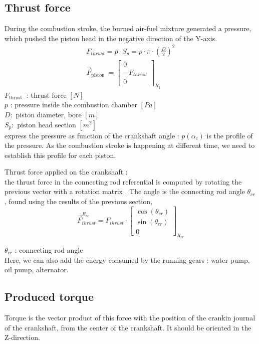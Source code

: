 \documentclass[12pt,a4paper]{article}
\begin{document}
	\subsection{Thrust force}
	During the combustion stroke, the burned air-fuel mixture generated a pressure, which pushed the piston head in the negative direction of the Y-axis.
	\begin{gather*}
		F_{thrust}=p \cdot S_{p}=p \cdot \pi \cdot\left(\frac{D}{2}\right)^{2}  \tag{2}\\
		\vec{F}_{\text {piston }}=\left[\begin{array}{c}
			0 \\
			- F_{thrust} \\
			0
		\end{array}\right]_{R_{1}} \tag{3}
	\end{gather*}
	$F_{\text {thrust }}$ : thrust force $[N]$\\
	$p$ : pressure inside the combustion chamber $[P a]$\\
	$D:$ piston diameter, bore $[m]$\\
	$S_{p}:$ piston head section $\left[m^{2}\right]$\\
	
	express the pressure as function of the crankshaft angle : $p(\alpha_c)$ is the profile of the pressure. As the combustion stroke is happening at different time, we need to establish this profile for each piston.  
	

	Thrust force applied on the crankshaft : \\
	the thrust force in the connecting rod referential is computed by rotating the previous vector with a rotation matrix . The angle is the connecting rod angle $\theta_{cr}$, found using the results of the previous section, 
	\[
	\vec{F}_{thrust}^{R_{c c}}=F_{thrust} \cdot\left[\begin{array}{c}
		\cos \left(\theta_{cr}\right)  \tag{5}\\
		\sin \left(\theta_{cr}\right) \\
		0
	\end{array}\right]_{R_{cr}}
	\]
	
	$\theta_{cr}$ : connecting rod angle\\
	
	Here, we can also add the energy consumed by the running gears : water pump, oil pump, alternator.
	\subsection{Produced torque}
	Torque is the vector product of this force with the position of the crankin journal of the crankshaft,  from the center of the crankshaft. It should be oriented in the Z-direction.
		
\end{document}
